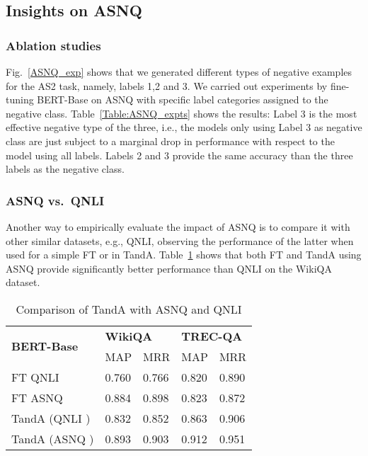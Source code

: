 \documentclass[letterpaper]{article} \usepackage{aaai20}  \usepackage{times}  \usepackage{helvet} \usepackage{courier}  \usepackage[hyphens]{url}  \usepackage{graphicx} \urlstyle{rm} \def\UrlFont{\rm}  \usepackage{graphicx}  \usepackage{todonotes}
\newcommand{\TANDA}{T{\sc and}A}
\begin{document}
\subsection{Insights on ASNQ}

\subsubsection{Ablation studies} \label{ANSQ_experiments}

Fig.~\ref{ASNQ_exp} shows that we generated different types of negative examples for the AS2 task, namely, labels 1,2 and 3. We carried out experiments by fine-tuning BERT-Base on ASNQ with specific label categories assigned to the negative class. Table~\ref{Table:ASNQ_expts} shows the results: Label 3 is the most effective negative type of the three, i.e., the models only using Label 3 as negative class are just subject to a marginal drop in performance with respect to the model using all labels. Labels 2 and 3 provide the same accuracy than the three labels as the negative class.


\subsubsection{ASNQ vs.~QNLI}
Another way to empirically evaluate the impact of ASNQ is to compare it with other similar datasets, e.g., QNLI, observing the performance of the latter when used for a simple FT or in {\TANDA}. 
Table~\ref{Table:QNLI_results} shows that both  FT and {\TANDA} using ASNQ provide significantly better performance than QNLI on  the \mbox{WikiQA} dataset. 


\begin{table}[h]
\small
\center
\begin{tabular}{|l|l|l|l|l|}
\hline
\multirow{2}{*}{\textbf{BERT-Base}}    & \multicolumn{2}{l|}{\textbf{WikiQA}} & \multicolumn{2}{l|}{\textbf{TREC-QA}} \\ \cline{2-5} 
                          & MAP          & MRR          & MAP          & MRR          \\ \hline
 FT QNLI         & 0.760        & 0.766        & 0.820        & 0.890        \\ \hline
 FT ASNQ         & 0.884        & 0.898        & 0.823        & 0.872        \\ \hline
  {\TANDA}  (QNLI  )& 0.832        & 0.852        & 0.863        & 0.906        \\ \hline
  {\TANDA}  (ASNQ  ) & 0.893        & 0.903        & 0.912        & 0.951        \\ \hline
\end{tabular}\caption{Comparison of {\TANDA}  with ASNQ and QNLI}
\label{Table:QNLI_results}
\vspace{-1em}
\end{table}
\end{document}
